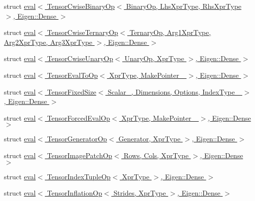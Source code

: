 \begin{DoxyCompactItemize}
struct \hyperlink{struct_eigen_1_1internal_1_1eval_3_01_tensor_cwise_binary_op_3_01_binary_op_00_01_lhs_xpr_type_07911fe375dfab05cfcedb209a79e59fe}{eval$<$ Tensor\+Cwise\+Binary\+Op$<$ Binary\+Op, Lhs\+Xpr\+Type, Rhs\+Xpr\+Type $>$, Eigen\+::\+Dense $>$}
\item 
struct \hyperlink{struct_eigen_1_1internal_1_1eval_3_01_tensor_cwise_ternary_op_3_01_ternary_op_00_01_arg1_xpr_typ2e0e11b3e51fbd9d6e7353fff125bc73}{eval$<$ Tensor\+Cwise\+Ternary\+Op$<$ Ternary\+Op, Arg1\+Xpr\+Type, Arg2\+Xpr\+Type, Arg3\+Xpr\+Type $>$, Eigen\+::\+Dense $>$}
\item 
struct \hyperlink{struct_eigen_1_1internal_1_1eval_3_01_tensor_cwise_unary_op_3_01_unary_op_00_01_xpr_type_01_4_00_01_eigen_1_1_dense_01_4}{eval$<$ Tensor\+Cwise\+Unary\+Op$<$ Unary\+Op, Xpr\+Type $>$, Eigen\+::\+Dense $>$}
\item 
struct \hyperlink{struct_eigen_1_1internal_1_1eval_3_01_tensor_eval_to_op_3_01_xpr_type_00_01_make_pointer___01_4_00_01_eigen_1_1_dense_01_4}{eval$<$ Tensor\+Eval\+To\+Op$<$ Xpr\+Type, Make\+Pointer\+\_\+ $>$, Eigen\+::\+Dense $>$}
\item 
struct \hyperlink{struct_eigen_1_1internal_1_1eval_3_01_tensor_fixed_size_3_01_scalar___00_01_dimensions_00_01_opt4684245dd379548d9718102e7d8e2d48}{eval$<$ Tensor\+Fixed\+Size$<$ Scalar\+\_\+, Dimensions, Options, Index\+Type\+\_\+ $>$, Eigen\+::\+Dense $>$}
\item 
struct \hyperlink{struct_eigen_1_1internal_1_1eval_3_01_tensor_forced_eval_op_3_01_xpr_type_00_01_make_pointer___01_4_00_01_eigen_1_1_dense_01_4}{eval$<$ Tensor\+Forced\+Eval\+Op$<$ Xpr\+Type, Make\+Pointer\+\_\+ $>$, Eigen\+::\+Dense $>$}
\item 
struct \hyperlink{struct_eigen_1_1internal_1_1eval_3_01_tensor_generator_op_3_01_generator_00_01_xpr_type_01_4_00_01_eigen_1_1_dense_01_4}{eval$<$ Tensor\+Generator\+Op$<$ Generator, Xpr\+Type $>$, Eigen\+::\+Dense $>$}
\item 
struct \hyperlink{struct_eigen_1_1internal_1_1eval_3_01_tensor_image_patch_op_3_01_rows_00_01_cols_00_01_xpr_type_01_4_00_01_eigen_1_1_dense_01_4}{eval$<$ Tensor\+Image\+Patch\+Op$<$ Rows, Cols, Xpr\+Type $>$, Eigen\+::\+Dense $>$}
\item 
struct \hyperlink{struct_eigen_1_1internal_1_1eval_3_01_tensor_index_tuple_op_3_01_xpr_type_01_4_00_01_eigen_1_1_dense_01_4}{eval$<$ Tensor\+Index\+Tuple\+Op$<$ Xpr\+Type $>$, Eigen\+::\+Dense $>$}
\item 
struct \hyperlink{struct_eigen_1_1internal_1_1eval_3_01_tensor_inflation_op_3_01_strides_00_01_xpr_type_01_4_00_01_eigen_1_1_dense_01_4}{eval$<$ Tensor\+Inflation\+Op$<$ Strides, Xpr\+Type $>$, Eigen\+::\+Dense $>$}

\end{DoxyCompactItemize}
